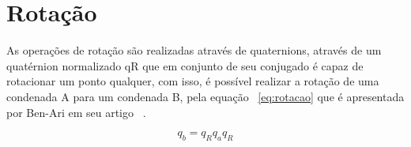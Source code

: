 \section{Rotação}

As operações de rotação são realizadas através de quaternions, 
através de um quatérnion normalizado qR que em conjunto de seu conjugado é capaz de rotacionar um ponto qualquer, 
com isso, é possível realizar a rotação de uma condenada A para um condenada B, pela equação ~\ref{eq:rotacao} que é apresentada por Ben-Ari em seu artigo ~\cite[]{Ben-Ari}. 

\begin{equation}
    q_b = q_Rq_aq_R
    \label{eq:rotacao}
\end{equation}
